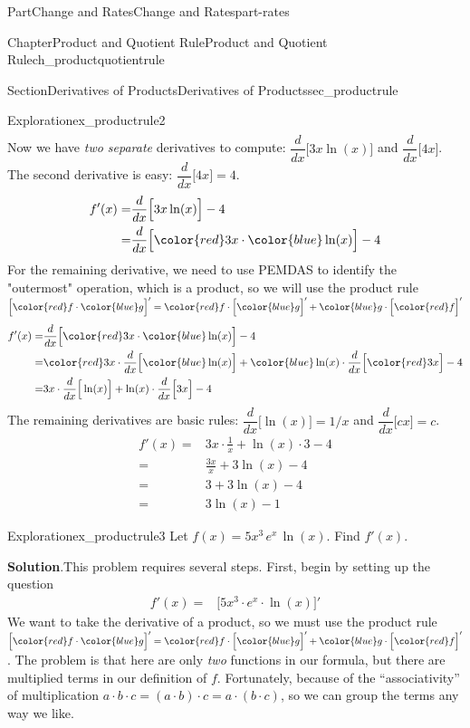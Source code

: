 \documentclass{tufte-book}
\newcommand{\blocktitlefont}{\relax}
\numberwithin{equation}{chapter}
\newcommand{\red}[1]{   {\color{red}   #1}   }
\newcommand{\blue}[1]{  {\color{blue}  #1}  }
\newcommand{\ddx}[1]{ \dfrac{d}{dx} \Big[ #1 \Big]  }
\newcommand{\D}[1]{ \Big[ #1 \Big]'  }
\newcommand{\amp}{&}
\begin{document}
\begin{partptx}{Part}{Change and Rates}{}{Change and Rates}{}{}{part-rates}
\begin{chapterptx}{Chapter}{Product and Quotient Rule}{}{Product and Quotient Rule}{}{}{ch_productquotientrule}
\begin{sectionptx}{Section}{Derivatives of Products}{}{Derivatives of Products}{}{}{sec_productrule}
\begin{exploration}{Exploration}{}{ex_productrule2}
\begin{align*}
\end{align*}
Now we have \emph{two separate} derivatives to compute: \(\ddx{ 3x\ln(x) } \) and \(\ddx{4x}\). The second derivative is easy: \(\ddx{4x}=4\).%
\begin{align*}
f'(x) = \amp \ddx{ 3x\ln(x) } - 4 \\
= \amp \ddx{ \red{3x}\cdot \blue{\ln(x)} } - 4 
\end{align*}
For the remaining derivative, we need to use PEMDAS to identify the "outermost" operation, which is a product, so we will use the product rule \(\D{\red{f}\cdot \blue{g}} = \red{f}\cdot \D{\blue{g}} + \blue{g}\cdot \D{\red{f}}\)%
\begin{align*}
f'(x) = \amp \ddx{ \red{3x}\cdot \blue{\ln(x)} } - 4 \\
= \amp \red{3x}\cdot \ddx{\blue{\ln(x)} } + \blue{\ln(x)}\cdot \ddx{\red{3x}} - 4 \\
= \amp 3x\cdot \ddx{ \ln(x) } + \ln(x) \cdot \ddx{ 3x } - 4 
\end{align*}
The remaining derivatives are basic rules: \(\ddx{\ln(x)} = 1/x\) and \(\ddx{cx} = c\).%
\begin{align*}
f'(x) = \amp 3x\cdot \frac{1}{x} + \ln(x) \cdot 3 - 4 \\
= \amp \frac{3x}{x} + 3\ln(x) - 4 \\
= \amp 3 + 3\ln(x) - 4 \\
= \amp 3\ln(x) - 1 
\end{align*}
%
\end{exploration}%
\begin{exploration}{Exploration}{}{ex_productrule3}%
Let \(f(x) = 5x^3\, e^x\,\ln(x)\).  Find \(f'(x)\).%
\par\smallskip%
\noindent\textbf{\blocktitlefont Solution}.\hypertarget{ex_productrule3-2}{}\quad{}This problem requires several steps.  First, begin by setting up the question%
\begin{align*}
f'(x) = \amp \D{5x^3\cdot e^x\cdot\ln(x)}  
\end{align*}
We want to take the derivative of a product, so we must use the product rule \(\D{\red{f}\cdot\blue{g}} = \red{f}\cdot\D{\blue{g}} + \blue{g}\cdot\D{\red{f}}\).  The problem is that  here are only \emph{two} functions in our formula, but there are multiplied terms in our definition of \(f\).  Fortunately, because of the ``associativity'' of multiplication \(a\cdot b\cdot c = (a\cdot b)\cdot c = a\cdot (b\cdot c)\), so we can group the terms any way we like.%
\begin{align*}

\end{align*}
\end{exploration}
\end{sectionptx}
\end{chapterptx}
\end{partptx}
\end{document}
